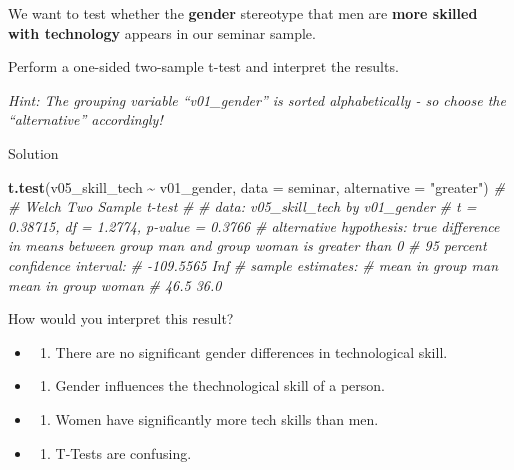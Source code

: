 \documentclass[
]{book}
\newenvironment{Shaded}{\begin{snugshade}}{\end{snugshade}}
\newcommand{\AttributeTok}[1]{\textcolor[rgb]{0.13,0.29,0.53}{#1}}
\newcommand{\CommentTok}[1]{\textcolor[rgb]{0.56,0.35,0.01}{\textit{#1}}}
\newcommand{\FunctionTok}[1]{\textcolor[rgb]{0.13,0.29,0.53}{\textbf{#1}}}
\newcommand{\NormalTok}[1]{#1}
\newcommand{\SpecialCharTok}[1]{\textcolor[rgb]{0.81,0.36,0.00}{\textbf{#1}}}
\newcommand{\StringTok}[1]{\textcolor[rgb]{0.31,0.60,0.02}{#1}}
\providecommand{\tightlist}{%
  \setlength{\itemsep}{0pt}\setlength{\parskip}{0pt}}
\begin{document}
We want to test whether the \textbf{gender} stereotype that men are \textbf{more skilled with technology} appears in our seminar sample.

Perform a one-sided two-sample t-test and interpret the results.

\emph{Hint: The grouping variable ``v01\_gender'' is sorted alphabetically - so choose the ``alternative'' accordingly!}

Solution

\begin{Shaded}
\begin{Highlighting}[]
\FunctionTok{t.test}\NormalTok{(v05\_skill\_tech }\SpecialCharTok{\textasciitilde{}}\NormalTok{ v01\_gender, }\AttributeTok{data =}\NormalTok{ seminar, }\AttributeTok{alternative =} \StringTok{"greater"}\NormalTok{)}
\CommentTok{\# }
\CommentTok{\#   Welch Two Sample t{-}test}
\CommentTok{\# }
\CommentTok{\# data:  v05\_skill\_tech by v01\_gender}
\CommentTok{\# t = 0.38715, df = 1.2774, p{-}value = 0.3766}
\CommentTok{\# alternative hypothesis: true difference in means between group man and group woman is greater than 0}
\CommentTok{\# 95 percent confidence interval:}
\CommentTok{\#  {-}109.5565       Inf}
\CommentTok{\# sample estimates:}
\CommentTok{\#   mean in group man mean in group woman }
\CommentTok{\#                46.5                36.0}
\end{Highlighting}
\end{Shaded}

How would you interpret this result?

\begin{itemize}
\tightlist
\item
  \begin{enumerate}
  \def\labelenumi{(\Alph{enumi})}
  \tightlist
  \item
    There are no significant gender differences in technological skill.\\
  \end{enumerate}
\item
  \begin{enumerate}
  \def\labelenumi{(\Alph{enumi})}
  \setcounter{enumi}{1}
  \tightlist
  \item
    Gender influences the thechnological skill of a person.\\
  \end{enumerate}
\item
  \begin{enumerate}
  \def\labelenumi{(\Alph{enumi})}
  \setcounter{enumi}{2}
  \tightlist
  \item
    Women have significantly more tech skills than men.\\
  \end{enumerate}
\item
  \begin{enumerate}
  \def\labelenumi{(\Alph{enumi})}
  \setcounter{enumi}{3}
  \tightlist
  \item
    T-Tests are confusing.
  \end{enumerate}
\end{itemize}
\end{document}
